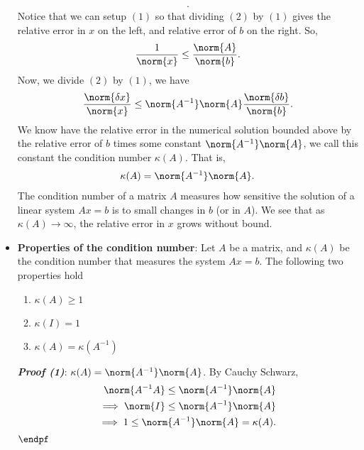 \documentclass{report}
\begin{document}
\begin{itemize}
\begin{align*}
            .\end{align*}
            Notice that we can setup $(1)$ so that dividing $(2)$ by $(1)$ gives the relative error in $x$ on the left, and relative error of $b$ on the right. So,
            \begin{align*}
                \frac{1}{\norm{x}} \leq \frac{\norm{A}}{\norm{b}}
            .\end{align*}
            Now, we divide $(2)$ by $(1)$, we have
            \begin{align*}
                \frac{\norm{\delta x}}{\norm{x}} \leq \norm{A^{-1}}\norm{A} \frac{\norm{ \delta  b}}{\norm{b}}
            .\end{align*}
            We know have the relative error in the numerical solution bounded above by the relative error of $b$ times some constant $\norm{A^{-1}}\norm{A}$, we call this constant the condition number $\kappa(A)$. That is,
            \begin{align*}
                \kappa(A) = \norm{A^{-1}}\norm{A}
            .\end{align*}
            The condition number of a matrix $A$ measures how sensitive the solution of a linear system $A x = b$ is to small changes in $b$ (or in $A$).
            \bigbreak \noindent 
            We see that as $\kappa(A) \to \infty$, the relative error in $x$ grows without bound.
        \item \textbf{Properties of the condition number}: Let $A$ be a matrix, and $\kappa(A)$ be the condition number that measures the system $Ax = b$. The following two properties hold
            \begin{enumerate}
                \item $\kappa(A) \geq 1$
                \item $\kappa(I) = 1$
                \item $\kappa(A) = \kappa(A^{-1}) $
            \end{enumerate}
            \bigbreak \noindent 
            \textbf{\textit{Proof (1)}}: $\kappa(A) = \norm{A^{-1}}\norm{A}$. By Cauchy Schwarz,
            \begin{align*}
                \norm{A^{-1}A} \leq \norm{A^{-1}} \norm{A} \\
                \implies \norm{I} \leq \norm{A^{-1}}\norm{A} \\
                \implies 1 \leq \norm{A^{-1}}\norm{A} = \kappa(A) 
            .\end{align*}
            $\endpf $
            \bigbreak \noindent 

\end{itemize}
\end{document}
